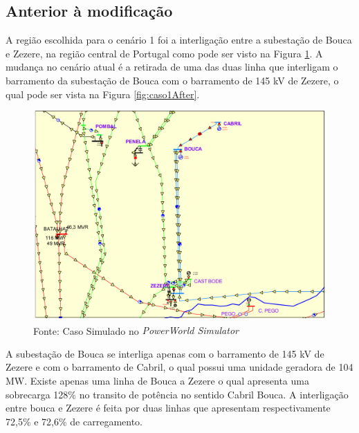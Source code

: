 \subsection{Anterior à modificação}

A região escolhida para o cenário 1 foi a interligação entre a subestação de Bouca e Zezere, na região central de Portugal como pode ser visto na Figura \ref{fig:caso1}. A mudança no cenário atual é a retirada de uma das duas linha que interligam o barramento da subestação de Bouca com o barramento de 145 kV de Zezere, o qual pode ser vista na Figura \ref{fig:caso1After}.

\vspace{3.3mm}

\begin{figure}[H]
	\centering
	\captionsetup{width=1\textwidth, font=footnotesize, textfont=bf}	
	\includegraphics[width=1\linewidth]{img/caso1.pdf}
	\caption{Cenário 1, anterior à modificação}
	\vspace{-3.5mm}
	\caption*{Fonte: Caso Simulado no \textit{PowerWorld\textsuperscript{\textregistered} Simulator}}
	\label{fig:caso1}
\end{figure}

A subestação de Bouca se interliga apenas com o barramento de 145 kV de Zezere e com o barramento de Cabril, o qual possui uma unidade geradora de 104 MW. Existe apenas uma linha de Bouca a Zezere o qual apresenta uma sobrecarga 128\% no transito de potência no sentido Cabril Bouca. A interligação entre bouca e Zezere é feita por duas linhas que apresentam respectivamente  72,5\% e 72,6\% de carregamento.

